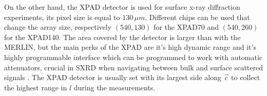 On the other hand, the XPAD detector \parencite{Basolo2005, Dawiec_2016} is used for surface x-ray diffraction experiments, its pixel size is equal to $130 \, \mu m$.
Different chips can be used that change the array size, respectively  $(540, 130)$ for the XPAD70 and $(540, 260)$ for the XPAD140.
The area covered by the detector is larger than with the MERLIN, but the main perks of the XPAD are it's high dynamic range and it's highly programmable interface \parencite{Fertey2013} which can be programmed to work with automatic attenuators, crucial in SXRD when navigating between bulk and surface scattered signals .
The XPAD detector is usually set with its largest side along $\vec{c}$ to collect the highest range in $l$ during the measurements.